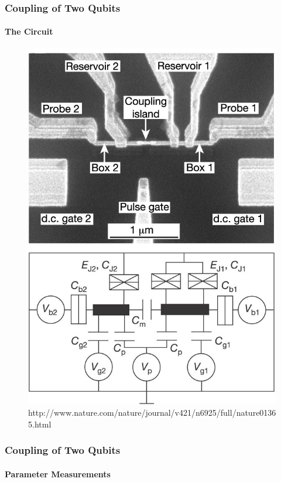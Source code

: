 \documentclass{beamer}
\begin{document}
\begin{frame}
    \frametitle{Coupling of Two Qubits}
    \framesubtitle{The Circuit}
    \begin{figure}[ht!]
        \centering
        \includegraphics[height=0.7\textheight]{img/circuit-sem-and-diagram.jpg}
        \caption{http://www.nature.com/nature/journal/v421/n6925/full/nature01365.html}
    \end{figure}
\end{frame}


\begin{frame}
    \frametitle{Coupling of Two Qubits}
    \framesubtitle{Parameter Measurements}
\end{frame}

\end{document}
